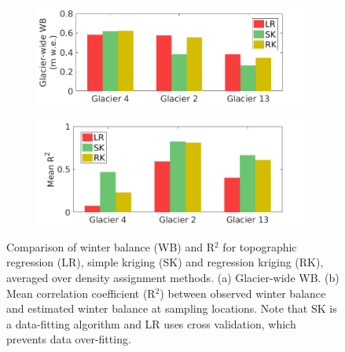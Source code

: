 \documentclass{sfuthesis}
\begin{document}
\begin{figure}
    \centering
    \begin{subfigure}[b]{0.7\textwidth}
      \includegraphics[width=\textwidth]{InterpMethod_mean.png}
        \caption[]{}
    \end{subfigure}
    
    \begin{subfigure}[b]{0.7\textwidth}
       \includegraphics[width=\textwidth]{InterpMethod_meanR2.png}
        \caption[]{}
    \end{subfigure}

    \caption[Comparison of winter balance (WB) and R$^2$ for topographic regression (LR), simple kriging (SK) and regression kriging (RK), averaged over density assignment methods]{Comparison of winter balance (WB) and R$^2$ for topographic regression (LR), simple kriging (SK) and regression kriging (RK), averaged over density assignment methods. (a) Glacier-wide WB.  (b) Mean correlation coefficient (R$^2$) between observed winter balance and estimated winter balance at sampling locations. Note that SK is a data-fitting algorithm and LR uses cross validation, which prevents data over-fitting.}
\label{fig:InterpMethod_mean}
\end{figure}
\end{document}
